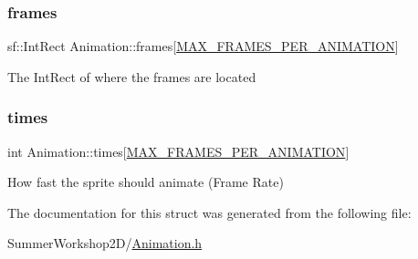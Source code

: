 \subsubsection{\texorpdfstring{frames}{frames}}
{\footnotesize\ttfamily sf\+::\+Int\+Rect Animation\+::frames\mbox{[}\hyperlink{_animation_8h_aefcfbff62033a5293157520b346713fb}{M\+A\+X\+\_\+\+F\+R\+A\+M\+E\+S\+\_\+\+P\+E\+R\+\_\+\+A\+N\+I\+M\+A\+T\+I\+ON}\mbox{]}}

The Int\+Rect of where the frames are located \mbox{\label{struct_animation_a3ba00e5e751106d59653fb6aaed2273a}} 
\subsubsection{\texorpdfstring{times}{times}}
{\footnotesize\ttfamily int Animation\+::times\mbox{[}\hyperlink{_animation_8h_aefcfbff62033a5293157520b346713fb}{M\+A\+X\+\_\+\+F\+R\+A\+M\+E\+S\+\_\+\+P\+E\+R\+\_\+\+A\+N\+I\+M\+A\+T\+I\+ON}\mbox{]}}

How fast the sprite should animate (Frame Rate) 

The documentation for this struct was generated from the following file\+:\begin{DoxyCompactItemize}
\item 
Summer\+Workshop2\+D/\hyperlink{_animation_8h}{Animation.\+h}\end{DoxyCompactItemize}
